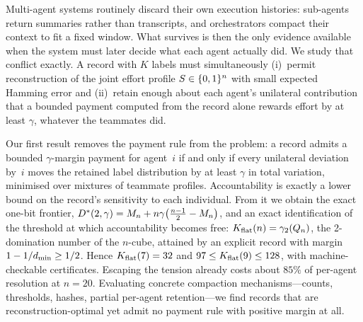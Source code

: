 Multi-agent systems routinely discard their own execution histories: sub-agents
return summaries rather than transcripts, and orchestrators compact their context
to fit a fixed window. What survives is then the only evidence available when the
system must later decide what each agent actually did. We study that conflict
exactly. A record with $K$ labels must simultaneously (i)~permit reconstruction
of the joint effort profile $S \in \{0,1\}^n$ with small expected Hamming error and
(ii)~retain enough about each agent's unilateral contribution that a bounded
payment computed from the record alone rewards effort by at least $\gamma$,
whatever the teammates did.

Our first result removes the payment rule from the problem: a record admits a
bounded $\gamma$-margin payment for agent~$i$ if and only if every unilateral
deviation by~$i$ moves the retained label distribution by at least $\gamma$ in
total variation, minimised over mixtures of teammate profiles. Accountability is
exactly a lower bound on the record's sensitivity to each individual. From it we
obtain the exact one-bit frontier,
$D^\ast(2,\gamma) = M_n + n\gamma\bigl(\tfrac{n-1}{2} - M_n\bigr)$, and an exact
identification of the threshold at which accountability becomes free:
$K_{\mathrm{flat}}(n) = \gamma_2(Q_n)$, the 2-domination number of the $n$-cube, attained by an
explicit record with margin $1 - 1/d_{\min} \ge 1/2$. Hence $K_{\mathrm{flat}}(7) = 32$ and
$97 \le K_{\mathrm{flat}}(9) \le 128$, with machine-checkable certificates. Escaping the
tension already costs about $85\%$ of per-agent resolution at $n = 20$.
Evaluating concrete compaction mechanisms---counts, thresholds,
hashes, partial per-agent retention---we find records that are
reconstruction-optimal yet admit no payment rule with positive margin at all.
